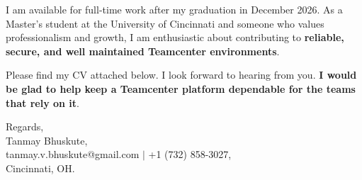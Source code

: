 \documentclass[11pt]{letter}
\begin{document}
\begin{letter}{}
I am available for full-time work after my graduation in December 2026. As a Master's student at the University of Cincinnati and someone who values professionalism and growth, I am enthusiastic about contributing to \textbf{reliable, secure, and well maintained Teamcenter environments}.

Please find my CV attached below. I look forward to hearing from you. \textbf{I would be glad to help keep a Teamcenter platform dependable for the teams that rely on it}.

{\setlength{\parskip}{0pt}
Regards,\\
Tanmay Bhuskute,\\
tanmay.v.bhuskute@gmail.com $\mid$ +1 (732) 858-3027,\\
Cincinnati, OH.
}

\end{letter}
\end{document}
